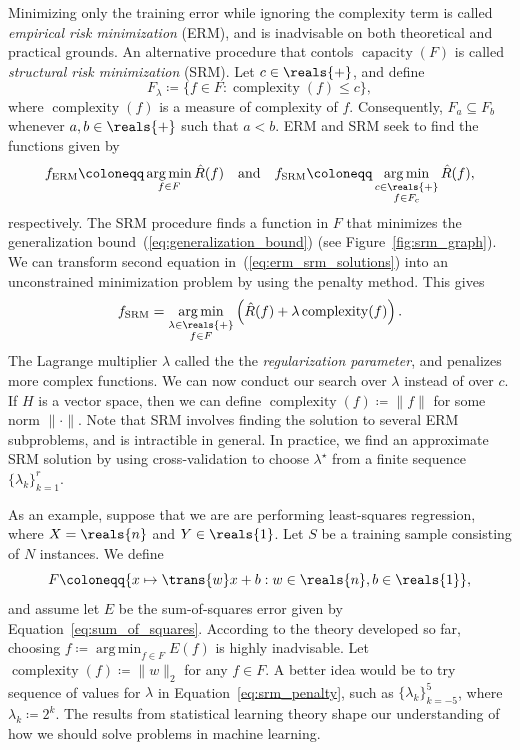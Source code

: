 \documentclass[11pt,a4paper]{article}
\numberwithin{equation}{section}
\newcommand{\capacity}{\operatorname{capacity}}
\newcommand{\complexity}{\operatorname{complexity}}
\newcommand{\argmin}{\operatorname*{arg\,min}}
\begin{document}
Minimizing only the training error while ignoring the complexity term is called
\emph{empirical risk minimization} (ERM), and is inadvisable on both theoretical
and practical grounds. An alternative procedure that contols $\capacity(F)$ is
called \emph{structural risk minimization} (SRM). Let $c \in \reals{+}$, and
define
\begin{equation}
	F_\lambda \coloneqq \{ f \in F : \complexity(f) \leq c \},
	\label{eq:regularized_family}
\end{equation}
where $\complexity(f)$ is a measure of complexity of $f$. Consequently, $F_a
\subseteq F_b$ whenever $a, b \in \reals{+}$ such that $a < b$. ERM and SRM seek
to find the functions given by
\begin{equation}
	f_{\text{ERM}} \coloneqq \argmin_{f \in F} \hat{R}(f)
	\quad\text{and}\quad
	f_{\text{SRM}} \coloneqq \argmin_{\substack{c \in \reals{+} \\ f \in F_c}}
		\hat{R}(f),
	\label{eq:erm_srm_solutions}
\end{equation}
respectively. The SRM procedure finds a function in $F$ that minimizes the
generalization bound~(\ref{eq:generalization_bound}) (see
Figure~\ref{fig:srm_graph}). We can transform second equation
in~(\ref{eq:erm_srm_solutions}) into an unconstrained minimization problem by
using the penalty method. This gives
\begin{equation}
	f_{\text{SRM}} = \argmin_{\substack{\lambda \in \reals{+} \\ f \in F}}
		\left(\hat{R}(f) + \lambda\complexity(f)\right).
	\label{eq:srm_penalty}
\end{equation}
The Lagrange multiplier $\lambda$ called the the \emph{regularization
parameter}, and penalizes more complex functions. We can now conduct our search
over $\lambda$ instead of over $c$. If $H$ is a vector space, then we can define
$\complexity(f) \coloneqq \|f\|$ for some norm ${\|\cdot\|}$. Note that SRM
involves finding the solution to several ERM subproblems, and is intractible in
general. In practice, we find an approximate SRM solution by using
cross-validation to choose $\lambda^\star$ from a finite sequence $\{ \lambda_k
\}_{k = 1}^r$.

As an example, suppose that we are are performing least-squares regression,
where $X = \reals{n}$ and $Y \in \reals{1}$. Let $S$ be a training sample
consisting of $N$ instances. We define
\[
	F \coloneqq \{ x \mapsto \trans{w}x + b : w \in \reals{n}, b \in
		\reals{1} \},
	\label{eq:affine_family}
\]
and assume let $E$ be the sum-of-squares error given by
Equation~\ref{eq:sum_of_squares}. According to the theory developed so far,
choosing $f \coloneqq \argmin_{f \in F} E(f)$ is highly inadvisable. Let
$\complexity(f) \coloneqq \|w\|_2$ for any $f \in F$. A better idea would be to
try sequence of values for $\lambda$ in Equation~\ref{eq:srm_penalty}, such as
$\{ \lambda_k \}_{k = -5}^5$, where $\lambda_k \coloneqq 2^k$. The results from
statistical learning theory shape our understanding of how we should solve
problems in machine learning.
\end{document}
